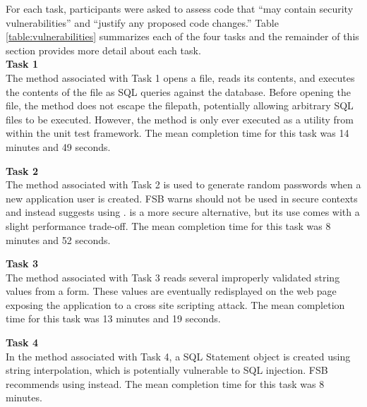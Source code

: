 \documentclass[10pt,journal,compsoc]{IEEEtran}
\begin{document}
For each task, participants were asked to assess code that ``may contain security vulnerabilities'' and ``justify any proposed code changes.''
Table \ref{table:vulnerabilities} summarizes each of the four tasks and the remainder of this section provides more detail about each task.\\

\noindent\textbf{Task 1} \\
The method associated with Task 1 opens a file, reads its contents, and executes the contents of the file as SQL queries against the database. 
Before opening the file, the method does not escape the filepath, potentially allowing arbitrary SQL files to be executed.
However, the method is only ever executed as a utility from within the unit test framework. The mean completion time for this task was 14 minutes and 49 seconds.

\noindent\textbf{Task 2} \\
The method associated with Task 2 is used to generate random passwords when a new application user is created. FSB warns  should not be used in secure contexts and instead suggests using .  is a more secure alternative, but its use comes with a slight performance trade-off. 
The mean completion time for this task was 8 minutes and 52 seconds.

\noindent\textbf{Task 3} \\
The method associated with Task 3 reads several improperly validated string values from a form. 
These values are eventually redisplayed on the web page exposing the application to a cross site scripting attack. 
The mean completion time for this task was 13 minutes and 19 seconds.

\noindent\textbf{Task 4} \\
In the method associated with Task 4, a SQL Statement object is created using string interpolation, which is potentially vulnerable to SQL injection. FSB recommends using   instead. The mean completion time for this task was 8 minutes.
\\
\end{document}
